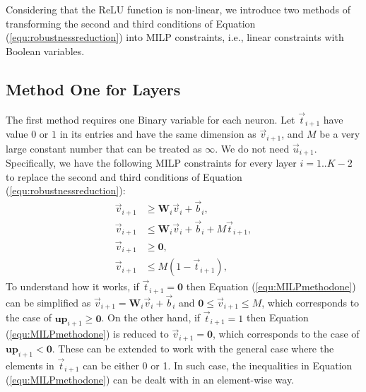 
Considering that the ReLU function is non-linear, we introduce two methods of transforming the second and third conditions of Equation (\ref{equ:robustnessreduction}) into MILP constraints, i.e., linear constraints with Boolean variables. 

\subsection*{Method One for Layers}

The first method requires one Binary variable for each neuron. Let $\vec{t}_{i+1}$ have value $0$ or $1$ in its entries and have the same dimension as $\vec{v}_{i+1}$, and $M$ be a very large constant number that can be treated as $\infty$. We do not need $\vec{u}_{i+1}$. Specifically, we have 
the following MILP constraints for every layer $i=1..K-2$ to replace the second and third conditions of Equation (\ref{equ:robustnessreduction}): 
\begin{equation}\label{equ:MILPmethodone}
    \begin{array}{ll}
    \vec{v}_{i+1} &\ge \textbf{W}_i \vec{v}_i + \vec{b}_i,  \\
    \vec{v}_{i+1} &\le \textbf{W}_i \vec{v}_i + \vec{b}_i + M\vec{t}_{i+1}, \\
    \vec{v}_{i+1} &\ge \textbf{0}, \\
    \vec{v}_{i+1} &\le M(1-\vec{t}_{i+1}),
    \end{array}
\end{equation}
To understand how it works, if $\vec{t}_{i+1}=\textbf{0}$ then Equation (\ref{equ:MILPmethodone}) can be simplified as $\vec{v}_{i+1}=\textbf{W}_i \vec{v}_i + \vec{b}_i$ and $\textbf{0}\leq \vec{v}_{i+1}\leq M$, which corresponds to the case of $\textbf{up}_{i+1}\geq \textbf{0}$. On the other hand, if $\vec{t}_{i+1}=1$ then Equation (\ref{equ:MILPmethodone}) is reduced to $\vec{v}_{i+1} = \textbf{0}$, which corresponds to the case of $\textbf{up}_{i+1}< \textbf{0}$. These can be extended to work with the general case where the elements in $\vec{t}_{i+1}$ can be either 0 or 1. In such case, the inequalities in Equation (\ref{equ:MILPmethodone}) can be dealt with in an element-wise way. 

